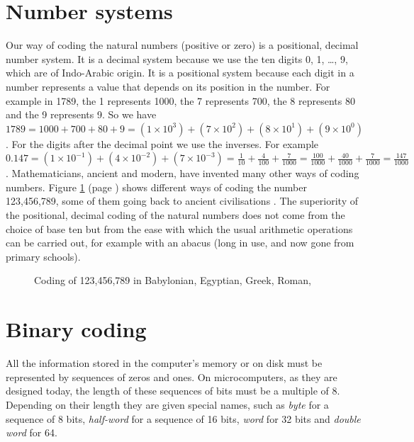 \section{Number systems}
Our way of coding the natural numbers (positive or zero) is a positional, decimal number system.
It is a decimal system because we use the ten digits 0, 1, \ldots, 9, which are of
Indo-Arabic origin. It is a positional system because each digit in a number represents a
value that depends on its position in the number. For example in 1789, the 1 represents 1000,
the 7 represents 700, the 8 represents 80 and the 9 represents 9. So we have $1789 = 1000 + 700
+ 80 + 9 = (1 \times 10^{3}) +  (7 \times 10^{2}) +  (8 \times 10^{1}) + (9 \times 10^{0})$.
For the digits after the decimal point we use the inverses. For example $0.147= (1\times 10^{-1})+
(4\times 10^{-2})+(7\times 10^{-3})=\frac{1}{10}+\frac{4}{100}+\frac{7}{1000}=\frac{100}{1000}+\frac{40}{1000}+\frac{7}{1000}=\frac{147}{1000}$.
Mathematicians, ancient and modern, have invented many other ways of coding numbers.
Figure \ref{fig:code1-9} (page \pageref{fig:code1-9}) shows different ways of coding the number
123,456,789, some of them going back to ancient civilisations \cite{guitel}. The superiority of
the positional, decimal coding of the natural numbers does not come from the choice of base ten but
from the ease with which the usual arithmetic operations can be carried out,
for example with an abacus (long in use, and now gone from
primary schools).

\begin{figure}[htbp]
 \caption{Coding of 123,456,789 in Babylonian, Egyptian, Greek, Roman,\label{fig:code1-9}}
\end{figure}


\section{Binary coding}

All the information stored in the computer's memory or on disk must
be represented by sequences of zeros and ones. On microcomputers,
as they are designed today, the length of these sequences of bits must be a multiple
of 8. Depending on their length they are given special names, such as {\em byte} for a sequence
of 8 bits, {\em half-word} for a sequence of 16 bits, {\em word} for 32 bits and {\em double word}
for 64.

